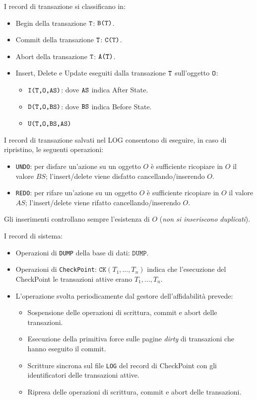 \documentclass[oneside,a4paper,11pt]{book}
\theoremstyle{italicstyle}
\theoremstyle{normStyle}
\begin{document}
I record di transazione si classificano in:
\begin{itemize}
    \item Begin della transazione $\verb|T|$: $\verb|B(T)|$.
    \item Commit della transazione $\verb|T|$: $\verb|C(T)|$.
    \item Abort della transazione $\verb|T|$: $\verb|A(T)|$.
    \item Insert, Delete e Update eseguiti dalla transazione $\verb|T|$ sull'oggetto $\verb|O|$:
    \begin{itemize}
        \item $\verb|I(T,O,AS)|$: dove $\verb|AS|$ indica After State.
        \item $\verb|D(T,O,BS)|$: dove $\verb|BS|$ indica Before State.
        \item $\verb|U(T,O,BS,AS)|$
    \end{itemize}
\end{itemize}
I record di transazione salvati nel LOG consentono di eseguire,
in caso di ripristino, le seguenti operazioni:
\begin{itemize}
    \item \verb|UNDO|: per disfare un'azione su un oggetto $O$ è sufficiente 
    ricopiare in $O$ il valore $BS$; l'insert/delete viene disfatto 
    cancellando/inserendo $O$.
    \item \verb|REDO|: per rifare un'azione su un oggetto $O$ è sufficiente 
    ricopiare in $O$ il valore $AS$; l'insert/delete viene rifatto 
    cancellando/inserendo $O$.
\end{itemize}
Gli inserimenti controllano sempre l'esistenza di $O$ (\textit{non si 
inseriscono duplicati}).

I record di sistema:
\begin{itemize}
    \item Operazioni di \verb|DUMP| della base di dati: $\texttt{DUMP}$.
    \item Operazioni di \verb|CheckPoint|: $\texttt{CK}(T_1,\dots,T_n)$ indica che l'esecuzione 
    del CheckPoint le transazioni attive erano $T_1, \dots, T_n$.
    \item L'operazione svolta periodicamente dal gestore dell'affidabilità prevede:
    \begin{itemize}
        \item Sospensione delle operazioni di scrittura, commit e abort delle transazioni.
        \item Esecuzione della primitiva force sulle pagine \textit{dirty} di transazioni che hanno eseguito il commit.
        \item Scritture sincrona sul file \verb|LOG| del record di CheckPoint con gli 
        identificatori delle transazioni attive.
        \item Ripresa delle operazioni di scrittura, commit e abort delle transazioni.
    \end{itemize}
\end{itemize}
\end{document}
